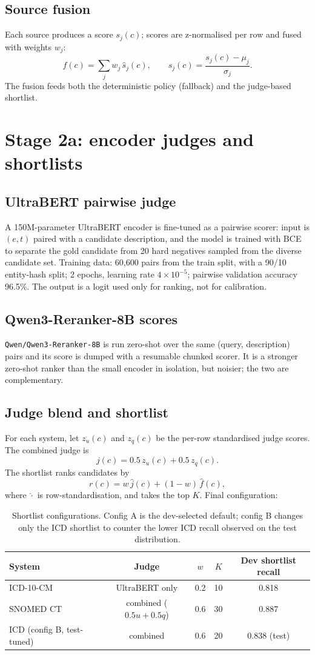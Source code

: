 \documentclass[11pt]{article}
\newcommand{\code}[1]{\texttt{#1}}
\begin{document}
\subsection{Source fusion}
Each source produces a score $s_j(c)$; scores are z-normalised per row and fused with
weights $w_j$:
\[
  f(c)=\sum_{j} w_j\, \hat{s}_j(c),\qquad \hat{s}_j(c)=\frac{s_j(c)-\mu_j}{\sigma_j}.
\]
The fusion feeds both the deterministic policy (fallback) and the judge-based shortlist.

\section{Stage 2a: encoder judges and shortlists}
\subsection{UltraBERT pairwise judge}
A 150M-parameter UltraBERT encoder is fine-tuned as a pairwise scorer: input is
$(e,t)$ paired with a candidate description, and the model is trained with BCE to separate
the gold candidate from 20 hard negatives sampled from the diverse candidate set.
Training data: 60{,}600 pairs from the train split, with a 90/10 entity-hash split; 2 epochs,
learning rate $4\times10^{-5}$; pairwise validation accuracy 96.5\%. The output is a logit
used only for ranking, not for calibration.

\subsection{Qwen3-Reranker-8B scores}
\code{Qwen/Qwen3-Reranker-8B} is run zero-shot over the same (query, description) pairs and
its score is dumped with a resumable chunked scorer. It is a stronger zero-shot ranker than
the small encoder in isolation, but noisier; the two are complementary.

\subsection{Judge blend and shortlist}
For each system, let $z_u(c)$ and $z_q(c)$ be the per-row standardised judge scores. The
combined judge is
\[
  j(c) = 0.5\, z_u(c) + 0.5\, z_q(c).
\]
The shortlist ranks candidates by
\[
  r(c) = w\,\hat{j}(c) + (1-w)\,\hat{f}(c),
\]
where $\hat{\cdot}$ is row-standardisation, and takes the top $K$. Final configuration:

\begin{table}[H]
\centering
\small
\begin{tabular}{@{}lcccc@{}}
\toprule
System & Judge & $w$ & $K$ & Dev shortlist recall\\
\midrule
ICD-10-CM & UltraBERT only & 0.2 & 10 & 0.818\\
SNOMED CT & combined ($0.5u+0.5q$) & 0.6 & 30 & 0.887\\
\midrule
ICD (config B, test-tuned) & combined & 0.6 & 20 & 0.838 (test)\\
\bottomrule
\end{tabular}
\caption{Shortlist configurations. Config A is the dev-selected default; config B changes only
the ICD shortlist to counter the lower ICD recall observed on the test distribution.}
\end{table}
\end{document}
